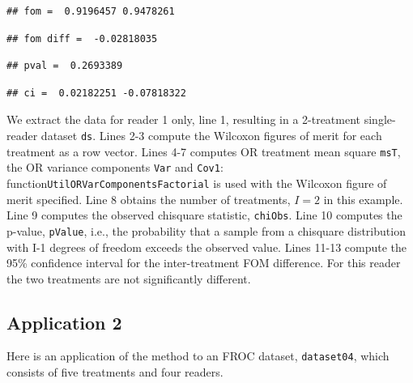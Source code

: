 \documentclass[
]{book}
\begin{document}
\begin{verbatim}
## fom =  0.9196457 0.9478261
\end{verbatim}

\begin{verbatim}
## fom diff =  -0.02818035
\end{verbatim}

\begin{verbatim}
## pval =  0.2693389
\end{verbatim}

\begin{verbatim}
## ci =  0.02182251 -0.07818322
\end{verbatim}

We extract the data for reader 1 only, line 1, resulting in a 2-treatment single-reader dataset \texttt{ds}. Lines 2-3 compute the Wilcoxon figures of merit for each treatment as a row vector. Lines 4-7 computes OR treatment mean square \texttt{msT}, the OR variance components \texttt{Var} and \texttt{Cov1}: function\texttt{UtilORVarComponentsFactorial} is used with the Wilcoxon figure of merit specified. Line 8 obtains the number of treatments, \(I=2\) in this example. Line 9 computes the observed chisquare statistic, \texttt{chiObs}. Line 10 computes the p-value, \texttt{pValue}, i.e., the probability that a sample from a chisquare distribution with I-1 degrees of freedom exceeds the observed value. Lines 11-13 compute the 95\% confidence interval for the inter-treatment FOM difference. For this reader the two treatments are not significantly different.

\hypertarget{or-method-intro-single-reader-application-froc}{%
\subsection{Application 2}\label{or-method-intro-single-reader-application-froc}}

Here is an application of the method to an FROC dataset, \texttt{dataset04}, which consists of five treatments and four readers.
\end{document}
